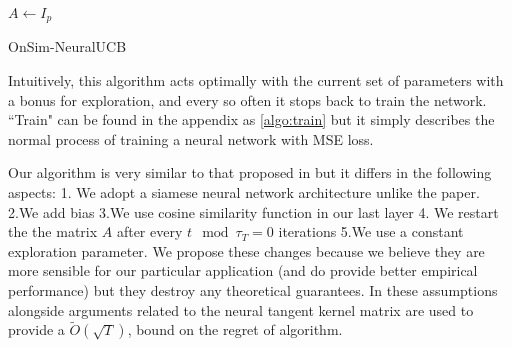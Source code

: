 \documentclass{article}
\begin{document}
\begin{algorithm}
    $A \gets I_{p}$\;
    \caption{OnSim-NeuralUCB}\label{algo:onsim-neuralucb}
  \end{algorithm}
Intuitively, this algorithm acts optimally with the current set of parameters with a bonus for exploration, and every so often it stops back to train the network.
``Train" can be found in the appendix as \ref{algo:train} but it simply describes the normal process of training a neural network with MSE loss.

Our algorithm is very similar to that proposed in \cite{neuralucb} but it differs in the following aspects: 1. We adopt a siamese neural network architecture unlike the paper.
2.We add bias 3.We use cosine similarity function in our last layer 4. We restart the the matrix $A$ after every $t \mod \tau_T = 0$ iterations 5.We use a constant exploration parameter.
We propose these changes because we believe they are more sensible for our particular application (and do provide better empirical performance) but they destroy any theoretical guarantees.
In \cite{neuralucb} these assumptions alongside arguments related to the  neural tangent kernel matrix \cite{neuraltangentkernel} are used to provide a $\tilde{O}(\sqrt{T})$, bound on the regret of algorithm.
\end{document}
